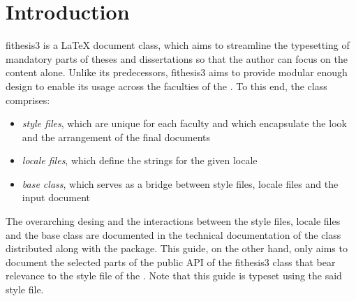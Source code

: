 \documentclass[color,table,cover,twoside,lot,lof]{../../fithesis3}
\begin{document}
  \makeatletter\thesis@preamble\makeatother
  \chapter{Introduction}
  \textsf{fithesis3} is a \LaTeX{} document class, which
  aims to streamline the typesetting of mandatory parts of theses
  and dissertations so that the author can focus on the content
  alone. Unlike its predecessors, \textsf{fithesis3} aims to
  provide modular enough design to enable its usage across the
  faculties of the \makeatletter\thesis@english@universityName%
  \makeatother. To this end, the class comprises:
  \begin{itemize}
    \item\emph{style files}, which are unique for each faculty and
      which encapsulate the look and the arrangement of the final
      documents
    \item\emph{locale files}, which define the strings for the
      given locale
    \item\emph{base class}, which serves as a bridge between style
      files, locale files and the input document
  \end{itemize}
  The overarching desing and the interactions between the style
  files, locale files and the base class are documented in the
  technical documentation of the class \cite{novotny15}
  distributed along with the package. This
  guide, on the other hand, only aims to document the selected
  parts of the public API of the \textsf{fithesis3} class
  that bear relevance to the style file of the
  \makeatletter\thesis@english@facultyName\makeatother. Note that
  this guide is typeset using the said style file.
\end{document}
